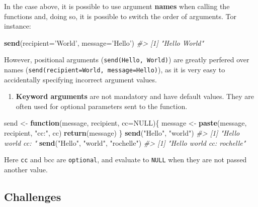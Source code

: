 \documentclass[]{book}
\newenvironment{Shaded}{\begin{snugshade}}{\end{snugshade}}
\newcommand{\KeywordTok}[1]{\textcolor[rgb]{0.13,0.29,0.53}{\textbf{#1}}}
\newcommand{\DataTypeTok}[1]{\textcolor[rgb]{0.13,0.29,0.53}{#1}}
\newcommand{\StringTok}[1]{\textcolor[rgb]{0.31,0.60,0.02}{#1}}
\newcommand{\CommentTok}[1]{\textcolor[rgb]{0.56,0.35,0.01}{\textit{#1}}}
\newcommand{\OtherTok}[1]{\textcolor[rgb]{0.56,0.35,0.01}{#1}}
\newcommand{\ControlFlowTok}[1]{\textcolor[rgb]{0.13,0.29,0.53}{\textbf{#1}}}
\newcommand{\NormalTok}[1]{#1}
\providecommand{\tightlist}{%
  \setlength{\itemsep}{0pt}\setlength{\parskip}{0pt}}
\begin{document}
In the case above, it is possible to use argument \textbf{names} when
calling the functions and, doing so, it is possible to switch the order
of arguments. Tor instance:

\begin{Shaded}
\begin{Highlighting}[]
\KeywordTok{send}\NormalTok{(}\DataTypeTok{recipient=}\StringTok{'World'}\NormalTok{, }\DataTypeTok{message=}\StringTok{'Hello'}\NormalTok{)}
\CommentTok{#> [1] "Hello World"}
\end{Highlighting}
\end{Shaded}

However, positional arguments
(\texttt{send(\textquotesingle{}Hello\textquotesingle{},\ \textquotesingle{}World\textquotesingle{})})
are greatly perfered over names
(\texttt{send(recipient=\textquotesingle{}World\textquotesingle{},\ message=\textquotesingle{}Hello\textquotesingle{})}),
as it is very easy to accidentally specifying incorrect argument values.

\begin{enumerate}
\def\labelenumi{\arabic{enumi})}
\setcounter{enumi}{1}
\tightlist
\item
  \textbf{Keyword arguments} are not mandatory and have default values.
  They are often used for optional parameters sent to the function.
\end{enumerate}

\begin{Shaded}
\begin{Highlighting}[]
\NormalTok{send <-}\StringTok{ }\ControlFlowTok{function}\NormalTok{(message, recipient, }\DataTypeTok{cc=}\OtherTok{NULL}\NormalTok{)\{}
\NormalTok{  message <-}\StringTok{ }\KeywordTok{paste}\NormalTok{(message, recipient, }\StringTok{"cc:"}\NormalTok{, cc)}
  \KeywordTok{return}\NormalTok{(message)}
\NormalTok{\}}
\KeywordTok{send}\NormalTok{(}\StringTok{"Hello"}\NormalTok{, }\StringTok{"world"}\NormalTok{) }
\CommentTok{#> [1] "Hello world cc: "}
\KeywordTok{send}\NormalTok{(}\StringTok{"Hello"}\NormalTok{, }\StringTok{"world"}\NormalTok{, }\StringTok{"rochelle"}\NormalTok{)}
\CommentTok{#> [1] "Hello world cc: rochelle"}
\end{Highlighting}
\end{Shaded}

Here \texttt{cc} and bcc are \texttt{optional}, and evaluate to
\texttt{NULL} when they are not passed another value.

\subsection{Challenges}\label{challenges-15}
\end{document}
